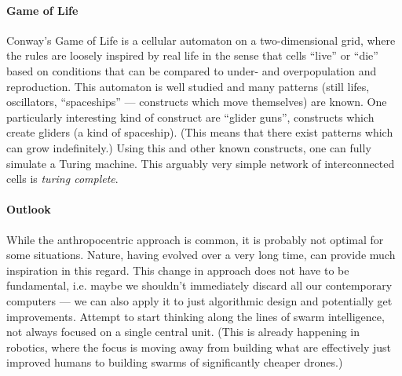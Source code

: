 \documentclass{article}
\begin{document}
\paragraph{Game of Life} Conway's Game of Life is a cellular automaton on a two-dimensional grid, where the rules are loosely inspired by real life in the sense that cells \enquote{live} or \enquote{die} based on conditions that can be compared to under- and overpopulation and reproduction. This automaton is well studied and many patterns (still lifes, oscillators, \enquote{spaceships} --- constructs which move themselves) are known. One particularly interesting kind of construct are \enquote{glider guns}, constructs which create gliders (a kind of spaceship). (This means that there exist patterns which can grow indefinitely.) Using this and other known constructs, one can fully simulate a Turing machine. This arguably very simple network of interconnected cells is \emph{turing complete}.

\paragraph{Outlook} While the anthropocentric approach is common, it is probably not optimal for some situations. Nature, having evolved over a very long time, can provide much inspiration in this regard. This change in approach does not have to be fundamental, i.e. maybe we shouldn't immediately discard all our contemporary computers --- we can also apply it to just algorithmic design and potentially get improvements. Attempt to start thinking along the lines of swarm intelligence, not always focused on a single central unit. (This is already happening in robotics, where the focus is moving away from building what are effectively just improved humans to building swarms of significantly cheaper drones.)
\end{document}
